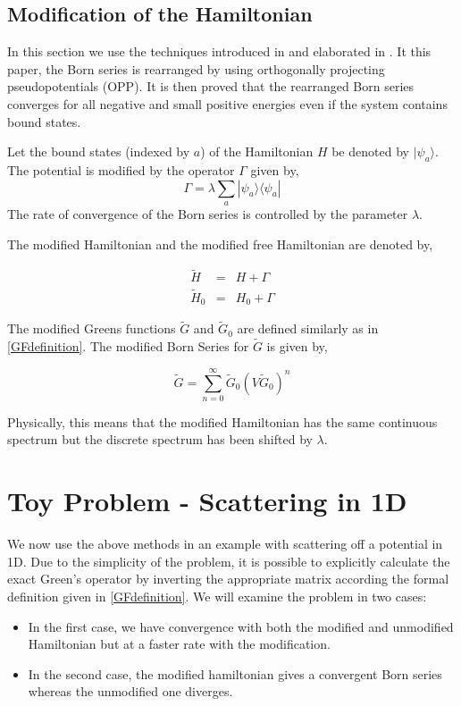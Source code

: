 \documentclass[a4paper,10pt]{report}
\begin{document}
\subsection{Modification of the Hamiltonian}
In this section we use the techniques introduced in \cite{KukPom76} and elaborated in
\cite{KukPom78}. It this paper, the Born
series is rearranged by using orthogonally projecting pseudopotentials (OPP). It is then
proved that the rearranged Born series converges for all negative and small positive energies
even if the system contains bound states.

Let the bound states (indexed by $a$) of the Hamiltonian $H$ be denoted by $|\psi_a\rangle$.
The potential is modified by the operator $\Gamma$ given by,
\begin{equation}\label{potmod}
  \Gamma=\lambda\displaystyle\sum_a |\psi_a\rangle\langle\psi_a|
\end{equation}
 The rate of convergence of the Born series is controlled by the parameter $\lambda$.

The modified Hamiltonian and the modified free Hamiltonian are denoted by,

\begin{align}
 \widetilde{H}&=&H+\Gamma\\
 \widetilde{H}_0&=&H_0+\Gamma
\end{align}

The modified Greens functions $\widetilde{G}$ and $\widetilde{G}_0$ are defined similarly as
in \eqref{GFdefinition}. The modified Born Series for $\widetilde{G}$ is given by,

\begin{equation}\label{BornSeriesModCompact}
 \widetilde{G}=\displaystyle\sum_{n=0}^{\infty}\widetilde{G}_0\left(V\widetilde{G}_0\right)^n
\end{equation}

 Physically, this means that the modified Hamiltonian has the same continuous spectrum but the discrete
spectrum has been shifted by $\lambda$.

\section{Toy Problem - Scattering in 1D}
We now use the above methods in an example with scattering off a potential in 1D. Due to the simplicity of the problem,
it is possible to explicitly calculate the exact Green's operator by inverting the appropriate matrix according the formal
definition given in \eqref{GFdefinition}. We will examine the problem in two cases: 
\begin{itemize}
 \item In the first case, we have convergence with both the modified and unmodified Hamiltonian but at a faster rate with the modification.
 \item In the second case, the modified hamiltonian gives a convergent Born series whereas the unmodified one diverges. 
\end{itemize}
\end{document}
